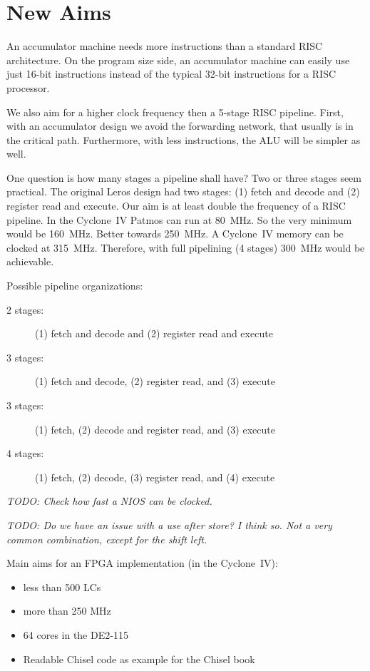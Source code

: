 \documentclass[a4paper,fontsize=10pt,twoside,DIV15,BCOR12mm,headinclude=true,footinclude=false,pagesize,bibtotoc]{scrbook}
\newcommand{\todo}[1]{{\emph{TODO: #1}}}
\begin{document}
\section{New Aims}

An accumulator machine needs more instructions than a standard RISC architecture.
On the program size side, an accumulator machine can easily use just 16-bit instructions
instead of the typical 32-bit instructions for a RISC processor.

We also aim for a higher clock frequency then a 5-stage RISC pipeline. First, with an
accumulator design we avoid the forwarding network, that usually is in the critical path.
Furthermore, with less instructions, the ALU will be simpler as well.

One question is how many stages a pipeline shall have? Two or three stages seem practical.
The original Leros design had two stages: (1) fetch and decode and (2) register read and execute.
Our aim is at least double the frequency of a RISC pipeline. In the Cyclone~IV
Patmos can run at 80~MHz. So the very minimum would be 160~MHz.
Better towards 250~MHz. A Cyclone~IV memory can be clocked at 315~MHz.
Therefore, with full pipelining (4 stages) 300~MHz would be achievable.

Possible pipeline organizations:

\begin{description}
\item[2 stages:] (1) fetch and decode and (2) register read and execute
\item[3 stages:] (1) fetch and decode, (2) register read, and (3) execute
\item[3 stages:] (1) fetch, (2) decode and register read, and (3) execute
\item[4 stages:] (1) fetch, (2) decode, (3) register read, and (4) execute
\end{description}
\todo{Check how fast a NIOS can be clocked.}

\todo{Do we have an issue with a use after store? I think so. Not a very common combination, except
for the shift left.}

Main aims for an FPGA implementation (in the Cyclone~IV):

\begin{itemize}
\item less than 500 LCs
\item more than 250 MHz
\item 64 cores in the DE2-115
\item Readable Chisel code as example for the Chisel book
\end{itemize}
\end{document}
